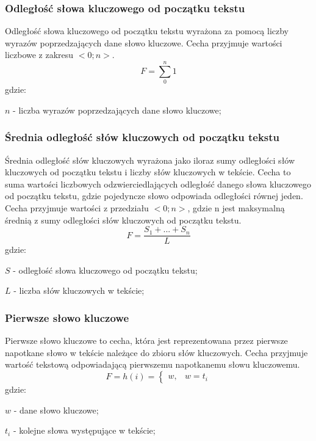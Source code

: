 \documentclass{classrep}
\begin{document}
\subsubsection{Odległość słowa kluczowego od początku tekstu}
Odległość słowa kluczowego od początku tekstu wyrażona za pomocą liczby wyrazów poprzedzających
dane słowo kluczowe.
Cecha przyjmuje wartości liczbowe z zakresu $<0; n>$.
\begin{equation}
    F=\sum_{0}^{n}1
\end{equation}
gdzie:\\
\begin{description}
    \item $n$ - liczba wyrazów poprzedzających dane słowo kluczowe;
\end{description}


\subsubsection{Średnia odległość słów kluczowych od początku tekstu}
Średnia odległość słów kluczowych wyrażona jako iloraz sumy odległości słów kluczowych od początku tekstu i liczby
słów kluczowych w tekście. Cecha to suma wartości liczbowych odzwierciedlających odległość danego słowa kluczowego
od początku tekstu, gdzie pojedyncze słowo odpowiada odległości równej jeden. Cecha przyjmuje wartości z przedziału $<0; n>$, gdzie n
jest maksymalną średnią z sumy odległości słów kluczowych od początku tekstu.
\begin{equation}
    F=\frac{S_{1} + ... + S_{n}}{L}
\end{equation}
gdzie:\\
\begin{description}
    \item $S$ - odległość słowa kluczowego od początku tekstu;
    \item $L$ -  liczba słów kluczowych w tekście;
\end{description}

\subsubsection{Pierwsze słowo kluczowe}
Pierwsze słowo kluczowe to cecha, która jest reprezentowana przez pierwsze napotkane słowo w tekście należące do zbioru słów kluczowych.
Cecha przyjmuje wartość
tekstową odpowiadającą pierwszemu napotkanemu słowu kluczowemu.
\begin{equation}
    F= h(i)=\left\{\begin{matrix}
       w, & w = t_{i}
    \end{matrix}\right.
\end{equation}
gdzie:\\
\begin{description}
    \item $w$ - dane słowo kluczowe;
    \item $t_{i}$ - kolejne słowa występujące w tekście;
\end{description}
\end{document}
